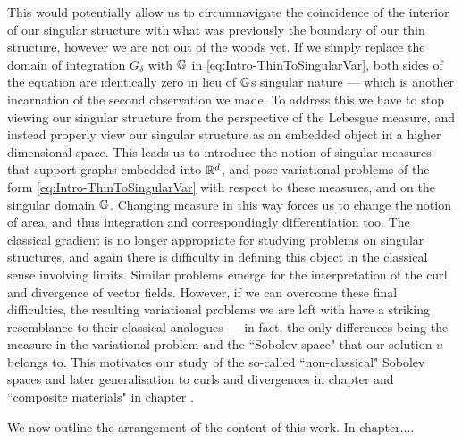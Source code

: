This would potentially allow us to circumnavigate the coincidence of the interior of our singular structure with what was previously the boundary of our thin structure, however we are not out of the woods yet.
If we simply replace the domain of integration $G_{\delta}$ with $\mathbb{G}$ in \eqref{eq:Intro-ThinToSingularVar}, both sides of the equation are identically zero in lieu of $\mathbb{G}$s singular nature --- which is another incarnation of the second observation we made.
To address this we have to stop viewing our singular structure from the perspective of the Lebesgue measure, and instead properly view our singular structure as an embedded object in a higher dimensional space.
This leads us to introduce the notion of singular measures that support graphs embedded into $\mathbb{R}^d$, and pose variational problems of the form \eqref{eq:Intro-ThinToSingularVar} with respect to these measures, and on the singular domain $\mathbb{G}$. 
Changing measure in this way forces us to change the notion of area, and thus integration and correspondingly differentiation too.
The classical gradient is no longer appropriate for studying problems on singular structures, and again there is difficulty in defining this object in the classical sense involving limits.
Similar problems emerge for the interpretation of the curl and divergence of vector fields.
However, if we can overcome these final difficulties, the resulting variational problems we are left with have a striking resemblance to their classical analogues --- in fact, the only differences being the measure in the variational problem and the ``Sobolev space" that our solution $u$ belongs to.
This motivates our study of the so-called ``non-classical" Sobolev spaces  and later generalisation to curls and divergences in chapter  and ``composite materials" in chapter .

We now outline the arrangement of the content of this work. In chapter....
